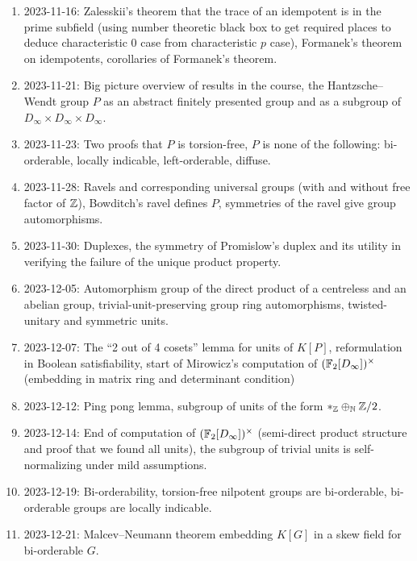 \begin{enumerate}
\item
2023-11-16: Zalesskii's theorem that the trace of an idempotent is in the prime subfield (using number theoretic black box to get required places to deduce characteristic $0$ case from characteristic $p$ case), Formanek's theorem on idempotents, corollaries of Formanek's theorem.

\item
2023-11-21: Big picture overview of results in the course, the Hantzsche--Wendt group $P$ as an abstract finitely presented group and as a subgroup of $D_\infty \times D_\infty \times D_\infty$.

\item
2023-11-23: Two proofs that $P$ is torsion-free, $P$ is none of the following: bi-orderable, locally indicable, left-orderable, diffuse.

\item
2023-11-28: Ravels and corresponding universal groups (with and without free factor of $\mathbb{Z}$), Bowditch's ravel defines $P$, symmetries of the ravel give group automorphisms.

\item
2023-11-30: Duplexes, the symmetry of Promislow's duplex and its utility in verifying the failure of the unique product property.

\item
2023-12-05: Automorphism group of the direct product of a centreless and an abelian group, trivial-unit-preserving group ring automorphisms, twisted-unitary and symmetric units.

\item
2023-12-07: The ``2 out of 4 cosets'' lemma for units of $K[P]$, reformulation in Boolean satisfiability, start of Mirowicz's computation of $(\mathbb{F}_2[D_\infty])^\times$ (embedding in matrix ring and determinant condition)

\item
2023-12-12: Ping pong lemma, subgroup of units of the form $\ast_{\mathbb{Z}} \oplus_{\mathbb{N}} \mathbb{Z} / 2$.

\item
2023-12-14: End of computation of $(\mathbb{F}_2[D_\infty])^\times$ (semi-direct product structure and proof that we found all units), the subgroup of trivial units is self-normalizing under mild assumptions.

\item
2023-12-19: Bi-orderability, torsion-free nilpotent groups are bi-orderable, bi-orderable groups are locally indicable.

\item
2023-12-21: Malcev--Neumann theorem embedding $K[G]$ in a skew field for bi-orderable $G$.
\end{enumerate}
